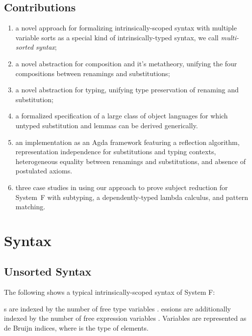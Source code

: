 \documentclass[a4paper, UKenglish, cleveref, autoref, thm-restate]{lipics-v2021}
\newenvironment{ExampleCode*}{%
  \begin{tcolorbox}[%
    colframe=white,%
    colback=yellow!5,%
    boxrule=0.0pt,%
    top=2.5pt,%
    left=2.5pt,%
    bottom=2.5pt,%
    right=2.5pt,%
    before skip=5pt,%
    after skip=5pt,%
    boxsep=0pt%
  ]\vspace{-0.2\baselineskip}%
}{%
  \vspace{-1\baselineskip}%
  \end{tcolorbox}%
}
\newcommand*\ExampleCode[1]{\begin{ExampleCode*}{#1}\end{ExampleCode*}}
\newcommand*\ACode[1]{\AgdaFontStyle{\textcolor{mygray}{#1}}}
\newcommand*\ACon[1]{\AgdaInductiveConstructor{#1}}
\begin{document}
  \subsection{Contributions}
  \label{sec:introduction:contributions}
  \begin{enumerate}
  \item
    a novel approach for formalizing intrinsically-scoped syntax with
    multiple variable sorts as a special kind of intrinsically-typed
    syntax, we call \emph{multi-sorted syntax};
  \item
    a novel abstraction for composition and it's metatheory, unifying
    the four compositions between renamings and substitutions;
  \item
    a novel abstraction for typing, unifying type
    preservation of renaming and substitution;
  \item
    a formalized specification of a large class of object languages
    for which untyped substitution and lemmas can be derived generically.
  \item
    an implementation as an Agda framework featuring
    a reflection algorithm, representation independence for
    substitutions and typing contexts, heterogeneous equality between
    renamings and substitutions, and absence of postulated axioms.
  \item
    three case studies in using our approach to prove subject reduction
    for System~F with subtyping, a dependently-typed lambda calculus, and
    pattern matching.
  \end{enumerate}

  \section{Syntax}
  \label{sec:syntax}
  \subsection{Unsorted Syntax}
  \label{sec:syntax:single}
  The following shows a typical intrinsically-scoped syntax of System F:
  \ExampleCode\FUnsortedSyntax

  \ACode{\ACon{Type}}s are indexed by the number of free type
  variables \ACode{n}.
  \ACode{\ACon{Expr}}essions are additionally indexed by the number of
  free expression variables \ACode{m}.
  Variables \ACode{\ACon{`\_}} are represented as de Bruijn indices, where
  \ACode{\ACon{Fin} n} is the type of \ACode{n} elements.
\end{document}
